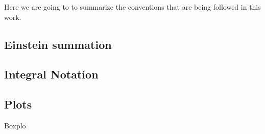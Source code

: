 Here we are going to to summarize the conventions that are being followed in this work.

\subsection{Einstein summation}

\subsection{Integral Notation}

\subsection{Plots}
Boxplo